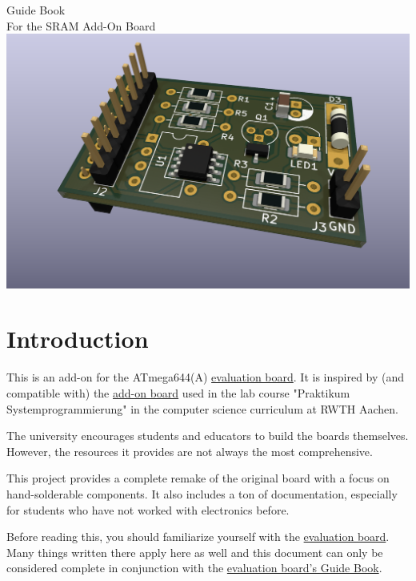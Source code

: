 \documentclass{article}
\newenvironment{note}{\begin{tcolorbox}[colback=blue!5!white,colframe=blue!75!black,title=\textbf{Note}]}{\end{tcolorbox}}
\newcommand{\evaboard}{\href{https://github.com/7vgn/EvaBoard/}{evaluation board}}
\begin{document}
\hypersetup{pageanchor=false}
\begin{titlepage}
\thispagestyle{empty}
\centering
\textsf{\Huge Guide Book}\\[1cm]
\textsf{\Large For the SRAM Add-On Board}\\[3cm]
\includegraphics[width=\textwidth]{Pictures/SRAMBoard3DRender.png}
\end{titlepage}
\hypersetup{pageanchor=true}

\tableofcontents
\section{Introduction}
This is an add-on for the ATmega644(A) \evaboard. It is inspired by (and compatible with) the \href{https://www.embedded.rwth-aachen.de/doku.php?id=lehre:atmegaevaboard}{add-on board} used in the lab course "Praktikum Systemprogrammierung" in the computer science curriculum at RWTH Aachen. 

The university encourages students and educators to build the boards themselves. However, the resources it provides are not always the most comprehensive. 

This project provides a complete remake of the original board with a focus on hand-solderable components. It also includes a ton of documentation, especially for students who have not worked with electronics before. 

\begin{note}
Before reading this, you should familiarize yourself with the \evaboard. Many things written there apply here as well and this document can only be considered complete in conjunction with the \href{https://github.com/7vgn/EvaBoard/Guide/EvaBoardGuide.pdf}{evaluation board's Guide Book}.
\end{note}
\end{document}
